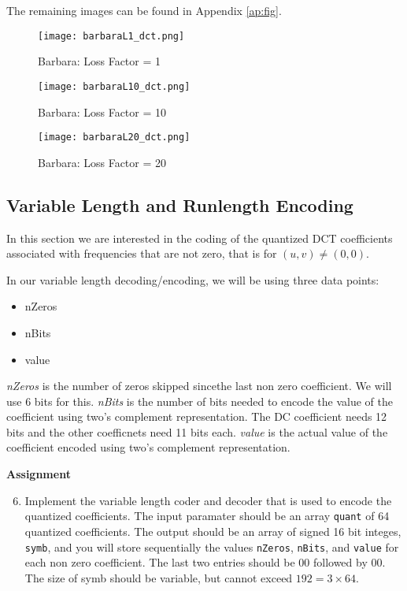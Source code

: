 \documentclass{article} %
\begin{document}
The remaining images can be found in Appendix \ref{ap:fig}. 

\begin{figure}[H]
\centering
\texttt{[image: barbaraL1\_dct.png]}
\caption{Barbara: Loss Factor = 1}
\end{figure}

\begin{figure}[H]
\centering
\texttt{[image: barbaraL10\_dct.png]}
\caption{Barbara: Loss Factor = 10}
\end{figure}

\begin{figure}[H]
\centering
\texttt{[image: barbaraL20\_dct.png]}
\caption{Barbara: Loss Factor = 20}
\end{figure}

\subsection{Variable Length and Runlength Encoding}

In this section we are interested in the coding of the quantized DCT coefficients associated with frequencies that are not
zero, that is for $(u,v)\neq (0,0)$. 

In our variable length decoding/encoding, we will be using three data points: 
\begin{itemize}
\item nZeros
\item nBits
\item value
\end{itemize}
\emph{nZeros} is the number of zeros skipped sincethe last non zero coefficient. We will use 6 bits for this. 
\emph{nBits} is the number of bits needed to encode the value of the coefficient using two's complement representation.
The DC coefficient needs 12 bits and the other coefficnets need 11 bits each. 
\emph{value} is the actual value of the coefficient encoded using two's complement representation. 



\begin{framed}
\textbf{Assignment}
\begin{enumerate}
\setcounter{enumi}{5}
\item Implement the variable length coder and decoder that is used to encode the quantized coefficients. 
The input paramater should be an array \verb|quant| of 64 quantized coefficients. The output should
be an array of signed 16 bit integes, \verb|symb|, and you will store sequentially the values \verb|nZeros|,
\verb|nBits|, and \verb|value| for each non zero coefficient. The last two entries should be 00 followed
by 00. The size of symb should be variable, but cannot exceed $192 = 3 \times 64$. 
\end{enumerate}
\end{framed}
\end{document}
